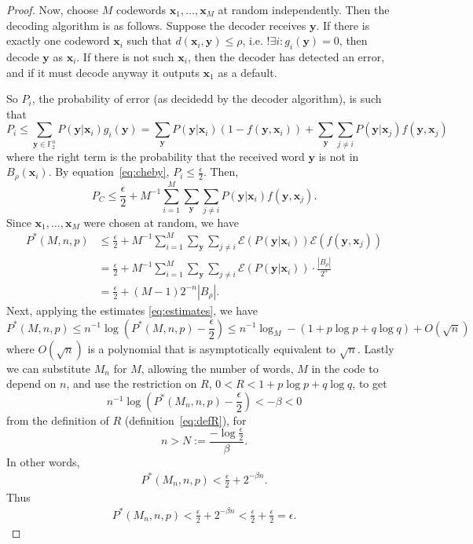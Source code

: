 \documentclass{article}
\newcommand{\F}{\mathbb{F}}
\newcommand{\E}{\mathcal{E}}
\renewcommand{\=}{\equiv}
\renewcommand{\i}{^{-1}}
\renewcommand{\v}{\mathbf}
\newcommand{\x}{{\v x}}
\newcommand{\y}{{\v y}}
\theoremstyle{plain}
\theoremstyle{definition}
\begin{document}
\begin{proof}
Now, choose $M$ codewords $\x_1, \dots, \x_M$ at random independently.
Then the decoding algorithm is as follows.
Suppose the decoder receives $\y$.
If there is exactly one codeword $\x_i$ such that $d(\x_i, \y) \leq \rho$, i.e. $!\exists i : g_i(\y) = 0$, then decode $\y$ as $\x_i$.
If there is not such $\x_i$, then the decoder has detected an error, and if it must decode anyway it outputs $\x_1$ as a default.

So $P_i$, the probability of error (as decidedd by the decoder algorithm), is such that
$$
  P_i
  \leq \sum_{\y \in \F_2^n} P(\y|\x_i) g_i(\y)
  = \sum_{\y} P(\y|\x_i)(1 - f(\y, \x_i)) + \sum_{\y} \sum_{j \neq i} P(\y|\x_j) f(\y, \x_j)
$$
where the right term is the probability that the received word $\y$ is not in $B_\rho(\x_i)$.
By equation~\ref{eq:cheby}, $P_i \leq \frac{\epsilon}{2}$.
Then,
$$ P_C \leq \frac{\epsilon}{2} + M\i \sum_{i = 1}^M \sum_{\y} \sum_{j \neq i} P(\y|\x_i) f(\y, \x_j). $$
Since $\x_1, \dots, \x_M$ were chosen at random, we have
\begin{align*}
  P^*(M, n, p)
  &\leq \frac{\epsilon}{2} + M\i \sum_{i = 1}^M \sum_{\y} \sum_{j \neq i} \E(P(\y|\x_i)) \E(f(\y, \x_j)) \\
  &= \frac{\epsilon}{2} + M\i \sum_{i = 1}^M \sum_{\y} \sum_{j \neq i} \E(P(\y|\x_i)) \cdot \frac{|B_\rho|}{2^n} \\
  &= \frac{\epsilon}{2} + (M - 1)2^{-n} |B_\rho|.
\end{align*}
Next, applying the estimates \ref{eq:estimates}, we have
$$ P^*(M, n, p) \leq n\i \log(P^*(M,n,p) - \frac{\epsilon}{2}) \leq n\i \log_M - (1 + p \log p + q \log q) + O(\sqrt{n}) $$
where $O(\sqrt{n})$ is a polynomial that is asymptotically equivalent to $\sqrt{n}$.
Lastly we can substitute $M_n$ for $M$, allowing the number of words, $M$ in the code to depend on $n$, and use the restriction on $R$, $0 < R < 1 + p \log p + q \log q$, to get
$$ n\i \log(P^*(M_n, n, p) - \frac{\epsilon}{2}) < - \beta < 0 $$
from the definition of $R$ (definition~\ref{eq:defR}), for $$n > N := \frac{-\log\frac{\epsilon}{2}}{\beta}.$$
In other words,
\begin{align*}
  P^*(M_n, n, p) < \frac{\epsilon}{2} + 2^{-\beta n}.
\end{align*}
Thus
\begin{align*}
  P^*(M_n, n, p)
  < \frac{\epsilon}{2} + 2^{-\beta n}
  < \frac{\epsilon}{2} + \frac{\epsilon}{2}
  = \epsilon.
\end{align*}
\end{proof}
\end{document}
